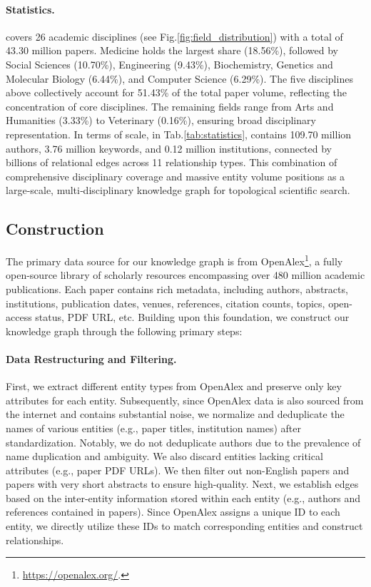 

\paragraph{Statistics.}
{\ours} covers 26 academic disciplines (see Fig.\ref{fig:field_distribution}) with a total of 43.30 million papers.
Medicine holds the largest share (18.56\%), followed by Social Sciences (10.70\%), Engineering (9.43\%), Biochemistry, Genetics and Molecular Biology (6.44\%), and Computer Science (6.29\%).
The five disciplines above collectively account for 51.43\% of the total paper volume, reflecting the concentration of core disciplines.
The remaining fields range from Arts and Humanities (3.33\%) to Veterinary (0.16\%), ensuring broad disciplinary representation.
In terms of scale, in Tab.\ref{tab:statistics}, {\ours} contains 109.70 million authors, 3.76 million keywords, and 0.12 million institutions, connected by billions of relational edges across 11 relationship types.
This combination of comprehensive disciplinary coverage and massive entity volume positions {\ours} as a large‑scale, multi‑disciplinary knowledge graph for topological scientific search.

\subsection{{\ours} Construction}
\label{sec:construction}

The primary data source for our knowledge graph is from OpenAlex\footnote{\url{https://openalex.org/}.}, a fully open-source library of scholarly resources encompassing over 480 million academic publications.
Each paper contains rich metadata, including authors, abstracts, institutions, publication dates, venues, references, citation counts, topics, open-access status, PDF URL, etc.
Building upon this foundation, we construct our knowledge graph through the following primary steps:

\paragraph{Data Restructuring and Filtering.}
First, we extract different entity types from OpenAlex and preserve only key attributes for each entity.
Subsequently, since OpenAlex data is also sourced from the internet and contains substantial noise, we normalize and deduplicate the names of various entities (e.g., paper titles, institution names) after standardization.
Notably, we do not deduplicate authors due to the prevalence of name duplication and ambiguity.
We also discard entities lacking critical attributes (e.g., paper PDF URLs).
We then filter out non-English papers and papers with very short abstracts to ensure high-quality.
Next, we establish edges based on the inter-entity information stored within each entity (e.g., authors and references contained in papers).
Since OpenAlex assigns a unique ID to each entity, we directly utilize these IDs to match corresponding entities and construct relationships.

